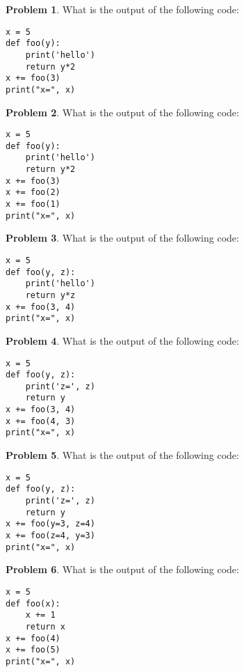 \documentclass[10pt]{article}
\theoremstyle{definition}
\newtheorem{problem}{Problem}
\begin{document}
\begin{problem}
    What is the output of the following code:
\end{problem}
\begin{lstlisting}
x = 5
def foo(y):
    print('hello')
    return y*2
x += foo(3)
print("x=", x)
\end{lstlisting}
\vspace{2in}


\begin{problem}
    What is the output of the following code:
\end{problem}
\begin{lstlisting}
x = 5
def foo(y):
    print('hello')
    return y*2
x += foo(3)
x += foo(2)
x += foo(1)
print("x=", x)
\end{lstlisting}
\vspace{2in}


\begin{problem}
    What is the output of the following code:
\end{problem}
\begin{lstlisting}
x = 5
def foo(y, z):
    print('hello')
    return y*z
x += foo(3, 4)
print("x=", x)
\end{lstlisting}
\vspace{2in}


\begin{problem}
    What is the output of the following code:
\end{problem}
\begin{lstlisting}
x = 5
def foo(y, z):
    print('z=', z)
    return y
x += foo(3, 4)
x += foo(4, 3)
print("x=", x)
\end{lstlisting}
\vspace{2in}


\begin{problem}
    What is the output of the following code:
\end{problem}
\begin{lstlisting}
x = 5
def foo(y, z):
    print('z=', z)
    return y
x += foo(y=3, z=4)
x += foo(z=4, y=3)
print("x=", x)
\end{lstlisting}
\vspace{2in}


\begin{problem}
    What is the output of the following code:
\end{problem}
\begin{lstlisting}
x = 5
def foo(x):
    x += 1
    return x
x += foo(4)
x += foo(5)
print("x=", x)
\end{lstlisting}
\vspace{2in}
\end{document}
